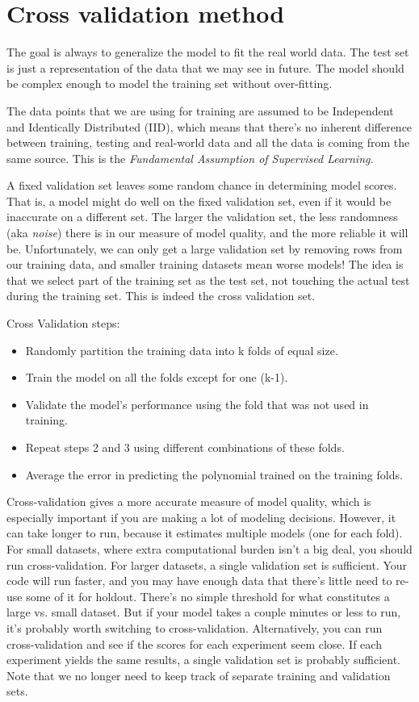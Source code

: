 \documentclass[12pt]{report}
\begin{document}
\section{Cross validation method}

The goal is always to generalize the model to fit the real world data. The test set is just a representation of the data that we may see in future. The model should be complex enough to model the training set without over-fitting.

The data points that we are using for training are assumed to be Independent and Identically Distributed (IID), which means that there’s no inherent difference between training, testing and real-world data and all the data is coming from the same source. This is the \textit{Fundamental Assumption of Supervised Learning.}


A fixed validation set leaves some random chance in determining model scores. That is, a model might do well on the fixed validation set, even if it would be inaccurate on a different set. The larger the validation set, the less randomness (aka \textit{noise}) there is in our measure of model quality, and the more reliable it will be. Unfortunately, we can only get a large validation set by removing rows from our training data, and smaller training datasets mean worse models! The idea is that we select part of the training set as the test set, not touching the actual test during the training set. This is indeed the cross validation set.

Cross Validation steps:

\begin{itemize}
  \item Randomly partition the training data into k folds of equal size.
  \item Train the model on all the folds except for one (k-1).
  \item Validate the model’s performance using the fold that was not used in training.
  \item Repeat steps 2 and 3 using different combinations of these folds.
  \item Average the error in predicting the polynomial trained on the training folds.
\end{itemize}

Cross-validation gives a more accurate measure of model quality, which is especially important if you are making a lot of modeling decisions. However, it can take longer to run, because it estimates multiple models (one for each fold). For small datasets, where extra computational burden isn't a big deal, you should run cross-validation. For larger datasets, a single validation set is sufficient. Your code will run faster, and you may have enough data that there's little need to re-use some of it for holdout. There's no simple threshold for what constitutes a large vs. small dataset. But if your model takes a couple minutes or less to run, it's probably worth switching to cross-validation. Alternatively, you can run cross-validation and see if the scores for each experiment seem close. If each experiment yields the same results, a single validation set is probably sufficient. Note that we no longer need to keep track of separate training and validation sets.
\end{document}
